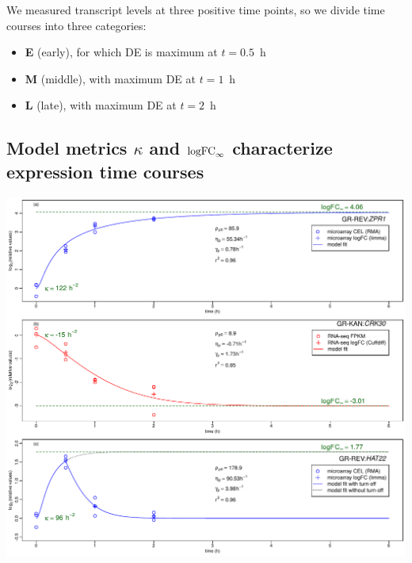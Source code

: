 \documentclass[aspb,landscape]{a0poster}
\newlength{\figwidth}
\newlength{\figtopspace}
\begin{document}
\begin{multicols}{3}
  We measured transcript levels at three positive time points, so we divide time courses into three categories:
  \begin{itemize}
  \item \textbf{E} (early), for which DE is maximum at $t=0.5$~h
  \item \textbf{M} (middle), with maximum DE at $t=1$~h
  \item \textbf{L} (late), with maximum DE at $t=2$~h
  \end{itemize}

  \subsection*{Model metrics $\kappa$ and ${\rm logFC}_{\infty}$ characterize expression time courses}
  
  \begin{center}\vspace{\figtopspace}
    \includegraphics[width=\figwidth]{asymptotes}
  \end{center}


\end{multicols}
\end{document}
